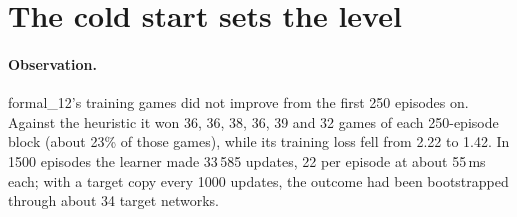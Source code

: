\section{The cold start sets the level}
\label{sec:cold-start-level}

\paragraph{Observation.} formal\_12's training games did not improve from the first 250 episodes on.
Against the heuristic it won 36, 36, 38, 36, 39 and 32 games of each 250-episode block (about 23\%
of those games), while its training loss fell from 2.22 to 1.42. In 1500 episodes the learner made
33\,585 updates, 22 per episode at about 55\,ms each; with a target copy every 1000 updates, the
outcome had been bootstrapped through about 34 target networks.

